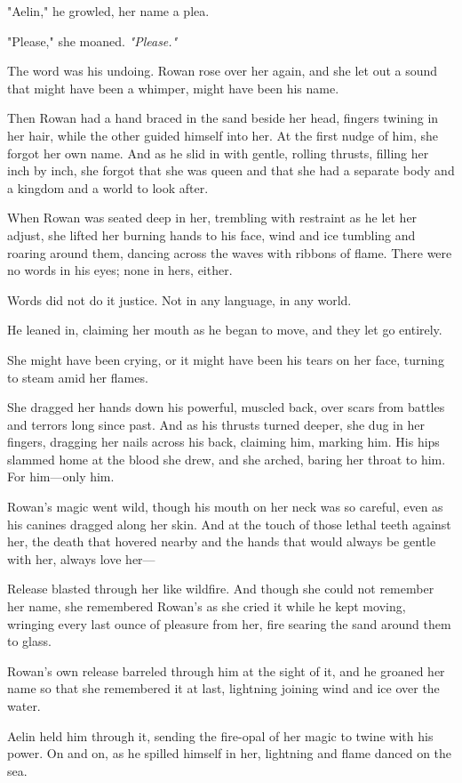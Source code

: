 "Aelin," he growled, her name a plea.

"Please," she moaned.
\emph{"Please."}

The word was his undoing.
Rowan rose over her again, and she let out a sound that might have been a whimper, might have been his name.

Then Rowan had a hand braced in the sand beside her head, fingers twining in her hair, while the other guided himself into her.
At the first nudge of him, she forgot her own name.
And as he slid in with gentle, rolling thrusts, filling her inch by inch, she forgot that she was queen and that she had a separate body and a kingdom and a world to look after.

When Rowan was seated deep in her, trembling with restraint as he let her adjust, she lifted her burning hands to his face, wind and ice tumbling and roaring around them, dancing across the waves with ribbons of flame.
There were no words in his eyes; none in hers, either.

Words did not do it justice.
Not in any language, in any world.

He leaned in, claiming her mouth as he began to move, and they let go entirely.

She might have been crying, or it might have been his tears on her face, turning to steam amid her flames.

She dragged her hands down his powerful, muscled back, over scars from battles and terrors long since past.
And as his thrusts turned deeper, she dug in her fingers, dragging her nails across his back, claiming him, marking him.
His hips slammed home at the blood she drew, and she arched, baring her throat to him.
For him---only him.

Rowan's magic went wild, though his mouth on her neck was so careful, even as his canines dragged along her skin.
And at the touch of those lethal teeth against her, the death that hovered nearby and the hands that would always be gentle with her, always love her---

Release blasted through her like wildfire.
And though she could not remember her name, she remembered Rowan's as she cried it while he kept moving, wringing every last ounce of pleasure from her, fire searing the sand around them to glass.

Rowan's own release barreled through him at the sight of it, and he groaned her name so that she remembered it at last, lightning joining wind and ice over the water.

Aelin held him through it, sending the fire-opal of her magic to twine with his power.
On and on, as he spilled himself in her, lightning and flame danced on the sea.

